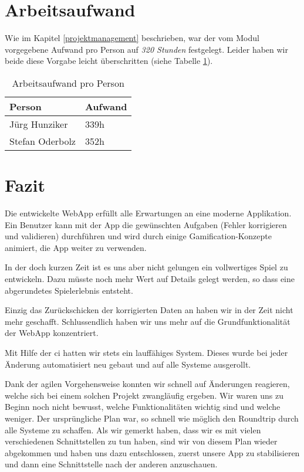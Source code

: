 \section{Arbeitsaufwand}
Wie im Kapitel \ref{projektmanagement} beschrieben, war der vom Modul vorgegebene Aufwand pro Person auf \emph{320 Stunden} festgelegt. Leider haben wir beide diese Vorgabe leicht überschritten (siehe Tabelle \ref{projektmanagement-arbeitsaufwand}).

\begin{table}[H]
\centering
\begin{tabular}{|l|l|}
\hline 
\textbf{Person} & \textbf{Aufwand} \\ 
\hline 
Jürg Hunziker & 339h \\
\hline 
Stefan Oderbolz & 352h \\  
\hline 
\end{tabular}
\caption{Arbeitsaufwand pro Person}
\label{projektmanagement-arbeitsaufwand}
\end{table} 

\section{Fazit}
\label{fazit}
Die entwickelte \gls{WebApp} erfüllt alle Erwartungen an eine moderne Applikation.
Ein Benutzer kann mit der App die gewünschten Aufgaben (Fehler korrigieren und validieren) durchführen und wird durch einige Gamification-Konzepte animiert, die App weiter zu verwenden.

In der doch kurzen Zeit ist es uns aber nicht gelungen ein vollwertiges Spiel zu entwickeln.
Dazu müsste noch mehr Wert auf Details gelegt werden, so dass eine abgerundetes Spielerlebnis entsteht.

Einzig das Zurückschicken der korrigierten Daten an  haben wir in der Zeit nicht mehr geschafft.
Schlussendlich haben wir uns mehr auf die Grundfunktionalität der \gls{WebApp} konzentriert.

Mit Hilfe der \gls{ci} hatten wir stets ein lauffähiges System.
Dieses wurde bei jeder Änderung automatisiert neu gebaut und auf alle Systeme ausgerollt.

Dank der agilen Vorgehensweise konnten wir schnell auf Änderungen reagieren, welche sich bei einem solchen Projekt zwangläufig ergeben.
Wir waren uns zu Beginn noch nicht bewusst, welche Funktionalitäten wichtig sind und welche weniger.
Der ursprüngliche Plan war, so schnell wie möglich den Roundtrip durch alle Systeme zu schaffen.
Als wir gemerkt haben, dass wir es mit vielen verschiedenen Schnittstellen zu tun haben, sind wir von diesem Plan wieder abgekommen und haben uns dazu entschlossen, zuerst unsere App zu stabilisieren und dann eine Schnittstelle nach der anderen anzuschauen.

